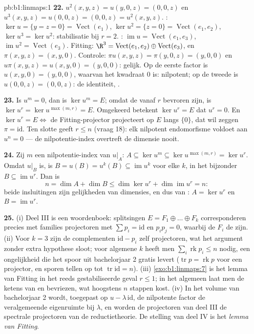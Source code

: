 \begin{solution}{pb:b1:linmaps:1}
\textbf{22.} $u^2(x,y,z) = u(y, 0, z) = (0, 0, z)$ en
$u^3(x,y,z) = u(0,0,z) = (0,0,z) = u^2(x,y,z)$. : $\ker u =
\{y = z = 0\} = \operatorname{Vect}(e_1)$, $\ker u^2 = \{z = 0\} =
\operatorname{Vect}(e_1, e_2)$, $\ker u^3 = \ker u^2$: stabilisatie
bij $r = 2$. : $\operatorname{im} u =
\operatorname{Vect}(e_1, e_3)$, $\operatorname{im} u^2 =
\operatorname{Vect}(e_3)$. Fitting: $\R^3 =
\operatorname{Vect}(e_1, e_2) \oplus \operatorname{Vect}(e_3)$, en
$\pi(x, y, z) = (x, y, 0)$. Controle: $\pi u(x,y,z) = \pi(y, 0, z)
= (y, 0, 0)$ en $u\pi(x,y,z) = u(x, y, 0) = (y, 0, 0)$: gelijk. Op
de eerste factor is $u(x, y, 0) = (y, 0, 0)$, waarvan het kwadraat
$0$ is: nilpotent; op de tweede is $u(0,0,z) = (0,0,z)$: de
identiteit, .

\textbf{23.} Is $u^m = 0$, dan is $\ker u^m = E$; omdat de 
vanaf $r$ bevroren zijn, is $\ker u^{r} = \ker u^{\max(m, r)} = E$.
Omgekeerd betekent $\ker u^{r} = E$ dat $u^{r} = 0$. En $\ker u^{r}
= E \iff$ de Fitting-projector projecteert op $E$ langs $\{0\}$,
dat wil zeggen $\pi = \mathrm{id}$. Ten slotte geeft $r \leq n$
(vraag 18): elk nilpotent endomorfisme voldoet aan $u^{n} = 0$ ---
de nilpotentie-index overtreft de dimensie nooit.

\textbf{24.} Zij $m$ een nilpotentie-index van $u|_A$: $A \subseteq
\ker u^{m} \subseteq \ker u^{\max(m,r)} = \ker u^{r}$. Omdat $u|_B$
 is, is $B = u(B) = u^{k}(B) \subseteq \operatorname{im}
u^{k}$ voor elke $k$, in het bijzonder $B \subseteq
\operatorname{im} u^{r}$. Dan is
\[
n = \dim A + \dim B \leq \dim\ker u^{r} +
\dim\operatorname{im} u^{r} = n :
\]
beide insluitingen zijn gelijkheden van dimensies, en dus van
: $A = \ker u^{r}$ en $B = \operatorname{im} u^{r}$.

\textbf{25.} (i) Deel III is een woordenboek: splitsingen $E = F_1
\oplus \dots \oplus F_k$ corresponderen precies met families
projectoren met $\sum p_i = \mathrm{id}$ en $p_i p_j = 0$, waarbij
de $F_i$ de  zijn. (ii) Voor $k = 3$ zijn de complementen
$\mathrm{id} - p_i$ zelf projectoren, wat het argument zonder extra
hypothese sloot; voor algemene $k$ heeft men $\sum_i
\operatorname{rk} p_i \leq n$ nodig, een ongelijkheid die het spoor
uit bachelorjaar 2 gratis levert ($\operatorname{tr} p =
\operatorname{rk} p$ voor een projector, en sporen tellen op tot
$\operatorname{tr} \mathrm{id} = n$). (iii)
\cref{exo:b1:linmaps:7} is het lemma van Fitting in het reeds
gestabiliseerde geval $r \leq 1$; in het algemeen laat men de
ketens van  en  bevriezen, wat hoogstens $n$ stappen
kost. (iv) In het volume van bachelorjaar 2 wordt, toegepast op $u
- \lambda\,\mathrm{id}$, de nilpotente factor de veralgemeende
eigenruimte bij $\lambda$, en worden de projectoren van deel III de
spectrale projectoren van de reductietheorie. De stelling van deel
IV is het \emph{lemma van Fitting}.
\end{solution}
